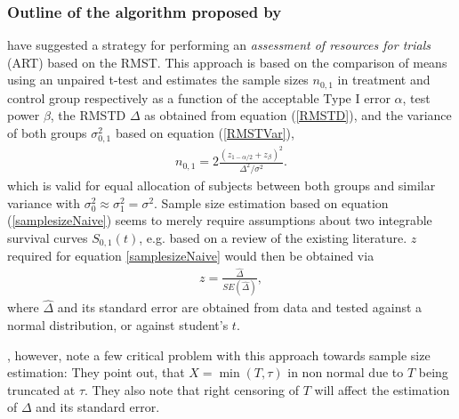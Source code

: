 \documentclass[main.tex]{subfiles}
\begin{document}
\subsubsection{Outline of the algorithm proposed by \textcite{royston2013restricted}}
\textcite{royston2013restricted} have suggested a strategy for performing an \textit{assessment of resources for trials} (ART) based on the RMST. This approach is based on the comparison of means using an unpaired t-test \parencite{rosner2015fundamentals} and estimates the sample sizes $n_{0,1}$ in treatment and control group respectively as a function of the acceptable Type I error $\alpha$, test power $\beta$, the RMSTD $\Delta$ as obtained from equation (\ref{RMSTD}), and the variance of both groups $\sigma^2_{0,1}$ based on equation (\ref{RMSTVar}),
\begin{align}\label{samplesizeNaive}
n_{0,1}=2\frac{(z_{1-\alpha/2}+z_\beta)^2}{\Delta^2 / \sigma^2}.
\end{align} %
which is valid for equal allocation of subjects between both groups and similar variance with $\sigma^2_0 \approx \sigma^2_1 = \sigma^2$. Sample size estimation based on equation (\ref{samplesizeNaive}) seems to merely require assumptions about two integrable survival curves $S_{0,1}(t)$, e.g. based on a review of the existing literature. $z$ required for equation \ref{samplesizeNaive} would then be obtained via
\begin{align}\label{z}
z = \frac{\hat{\Delta}}{SE(\hat{\Delta})},
\end{align}
where $\hat{\Delta}$ and its standard error are obtained from data and tested against a normal distribution, or against student's $t$.

\textcite{royston2013restricted}, however, note a few critical problem with this approach towards sample size estimation: They point out, that $X = \min(T, \tau)$ in non normal due to $T$ being truncated at $\tau$. They also note that right censoring of $T$ will affect the estimation of $\Delta$ and its standard error.
\end{document}
